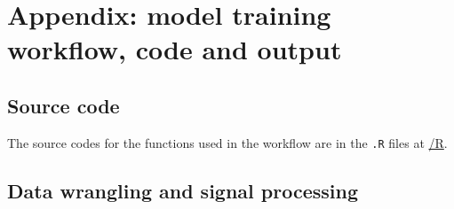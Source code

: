 \documentclass[
]{article}
\begin{document}
\hypertarget{appendix-model-training-workflow-code-and-output}{%
\section{Appendix: model training workflow, code and
output}\label{appendix-model-training-workflow-code-and-output}}

\hypertarget{source-code}{%
\subsection{Source code}\label{source-code}}

The source codes for the functions used in the workflow are in the
\texttt{.R} files at
\href{https://github.com/szmsu2011/comp90072/blob/main/R}{/R}.

\hypertarget{data-wrangling-and-signal-processing}{%
\subsection{Data wrangling and signal
processing}\label{data-wrangling-and-signal-processing}}
\end{document}
